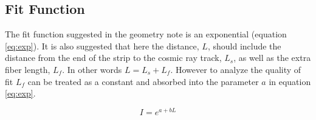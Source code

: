 \FloatBarrier
\subsection{Fit Function}
\FloatBarrier
The fit function suggested in the geometry note is an  exponential (equation \ref{eq:exp}).
It is also suggested that here the distance, $L$, should include the distance from the end of the strip 
to the cosmic ray track, $L_{s}$, as well as the extra fiber length, $L_{f}$.
In other words $L = L_{s} + L_{f}$.
However to analyze the quality of fit $L_{f}$ can be treated as a constant and absorbed into the parameter 
$a$ in equation \ref{eq:exp}.

\begin{equation}
    I = e^{a + bL}
    \label{eq:exp}
\end{equation}

